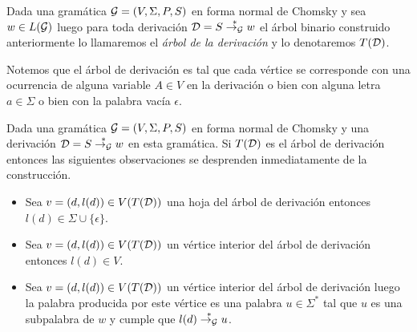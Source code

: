 \documentclass[tesis.tex]{subfiles}
\begin{document}
\begin{leoenv}
\begin{deff}
	Dada una gramática ${\cal G} = (V, \Sigma, P, S)$ \ic en forma normal de Chomsky y sea $w \in L({\cal G})$ luego para toda derivación ${\cal D} = S \overset{*}{\to_{\cal G}} w$ el árbol binario construido anteriormente lo llamaremos 
	el \emph{árbol de la derivación} y lo denotaremos $T({\cal D})$.
\end{deff}

Notemos que el árbol de derivación es tal que cada vértice se corresponde con una ocurrencia de alguna variable $A \in V$ en la derivación o bien con alguna letra $a \in \Sigma$ o bien con la palabra vacía $\epsilon$.

\begin{obs}\label{obs:arbol_deri_datos}
	Dada una gramática ${\cal G} = (V, \Sigma, P, S)$ \ic en forma normal de Chomsky y una derivación ${\cal D} = S \overset{*}{\to_{\cal G}} w$ en esta gramática. 
	Si $T({\cal D})$ es el árbol de derivación entonces las siguientes observaciones se desprenden inmediatamente de la construcción.
	\begin{itemize}
		\item Sea $v = (d,l(d)) \in V(T({\cal D}))$ una hoja del árbol de derivación entonces $l(d) \in \Sigma \cup \{ \epsilon \}$.
		\item Sea $v = (d,l(d)) \in V(T({\cal D}))$ un vértice interior del árbol de derivación entonces $l(d) \in V$.
		\item Sea $v = (d,l(d)) \in V(T({\cal D}))$ un vértice interior del árbol de derivación luego la palabra producida por este vértice es una palabra $u \in \Sigma^{*}$ tal que $u$ es una subpalabra de $w$ y cumple que $l(d) \overset{*}{\to_{\cal G}} u$. 
	\end{itemize}
\end{obs}




	

\end{leoenv}
\end{document}
